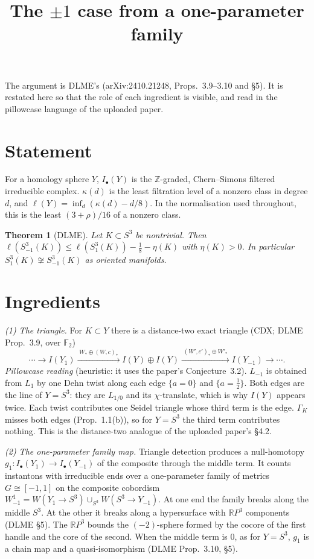 \documentclass[10pt]{amsart}
\title{The $\pm1$ case from a one-parameter family}
\date{}
\newtheorem{thm}{Theorem}
\newcommand{\st}[1]{\par\noindent\textit{#1}\enspace}
\begin{document}
\sloppy
\maketitle
\vspace{-2.5em}

\noindent The argument is DLME's (arXiv:2410.21248, Props.~3.9--3.10 and \S5). It is
restated here so that the role of each ingredient is visible, and read in the
pillowcase language of the uploaded paper.

\section{Statement}

For a homology sphere $Y$, $I_\bullet(Y)$ is the $\mathbb Z$-graded, Chern--Simons
filtered irreducible complex. $\kappa(d)$ is the least filtration level of a
nonzero class in degree $d$, and $\ell(Y)=\inf_d(\kappa(d)-d/8)$. In the
normalisation used throughout, this is the least $(3+\rho)/16$ of a nonzero class.

\begin{thm}[DLME]\label{t}
Let $K\subset S^3$ be nontrivial. Then $\ell(S^3_{-1}(K))\le\ell(S^3_1(K))-\frac18-\eta(K)$ with
$\eta(K)>0$. In particular $S^3_1(K)\not\cong S^3_{-1}(K)$ as oriented manifolds.
\end{thm}

\section{Ingredients}

\st{(1) The triangle.} For $K\subset Y$ there is a distance-two exact triangle
(CDX; DLME Prop.~3.9, over $\mathbb F_2$)
\[
\cdots\to I(Y_1)\xrightarrow{\;W_*\oplus(W,c)_*\;}I(Y)\oplus I(Y)\xrightarrow{\;(W',c')_*\oplus W'_*\;}I(Y_{-1})\to\cdots .
\]
\emph{Pillowcase reading} (heuristic: it uses the paper's Conjecture~3.2). $L_{-1}$ is obtained from $L_1$ by one Dehn twist along
each edge $\{a=0\}$ and $\{a=\frac12\}$. Both edges are the line of $Y=S^3$: they are
$L_{1/0}$ and its $\chi$-translate, which is why $I(Y)$ appears twice. Each twist
contributes one Seidel triangle whose third term is the edge. $\Gamma_K$ misses
both edges (Prop.~1.1(b)), so for $Y=S^3$ the third term contributes nothing.
This is the distance-two analogue of the uploaded paper's \S4.2.

\st{(2) The one-parameter family map.} Triangle detection produces a null-homotopy
$g_1\colon I_\bullet(Y_1)\to I_\bullet(Y_{-1})$ of the composite through the middle
term. It counts instantons with irreducible ends over a one-parameter family of
metrics $G\cong[-1,1]$ on the composite cobordism $W^1_{-1}=W(Y_1\to S^3)\cup_{S^3}W(S^3\to Y_{-1})$.
At one end the family breaks along the middle $S^3$. At the other it breaks along a
hypersurface with $\mathbb RP^3$ components (DLME \S5). The $\mathbb RP^3$ bounds the $(-2)$-sphere
formed by the cocore of the first handle and the core of the second. When the middle term is $0$, as for $Y=S^3$, $g_1$ is a
chain map and a quasi-isomorphism (DLME Prop.~3.10, \S5).
\end{document}
